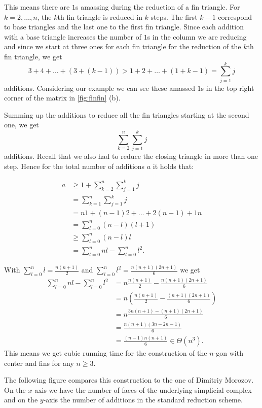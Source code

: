 This means there are $1$s amassing during the reduction of a fin triangle. For $k = 2,\dots,n$, the $k$th fin triangle is reduced in $k$ steps. The first $k-1$ correspond to base triangles and the last one to the first fin triangle. Since each addition with a base triangle increases the number of $1$s in the column we are reducing and since we start at three ones for each fin triangle for the reduction of the $k$th fin triangle, we get 
\[
	3 + 4 + \dots + (3 + (k-1)) > 1 + 2 + \dots + (1+k-1) = \sum_{j=1}^k j
\]
additions. Considering our example we can see these amassed $1$s in the top right corner of the matrix in \ref{fig:finfin} (b).

Summing up the additions to reduce all the fin triangles starting at the second one, we get 
\[
\sum_{k=2}^n \sum_{j=1}^k j
\]
additions. Recall that we also had to reduce the closing triangle in more than one step. Hence for the total number of additions $a$ it holds that: 

\begin{equation}
\begin{split}
 a & \geq 1+\sum_{k=2}^n \sum_{j=1}^k j \\
& = \sum_{k=1}^n \sum_{j=1}^k j\\
& = n1 + (n-1)2 + ... + 2(n-1) + 1n\\
& = \sum_{l=0}^n (n-l)(l+1) \\
& \geq \sum_{l=0}^n (n-l)l \\
& = \sum_{l=0}^n nl - \sum_{l=0}^n l^2.
\end{split}
\end{equation}

With $\sum_{l=0}^n l = \frac{n(n+1)}{2}$ and $\sum_{l=0}^n l^2 = \frac{n(n+1)(2n+1)}{6}$ we get
\begin{equation}
\begin{split}
 \sum_{l=0}^n nl - \sum_{l=0}^n l^2  & = n\frac{n(n+1)}{2} -\frac{n(n+1)(2n+1)}{6} \\
& = n(\frac{n(n+1)}{2} -\frac{(n+1)(2n+1)}{6}) \\
& = n\frac{3n(n+1)-(n+1)(2n+1)}{6} \\
& = \frac{n(n+1)(3n-2n-1)}{6} \\
&= \frac{(n-1)n(n+1)}{6} \in \Theta(n^3).
\end{split}
\end{equation}
This means we get cubic running time for the construction of the $n$-gon with center and fins for any $n\geq 3$. 

The following figure compares this construction to the one of Dimitriy Morozov. On the $x$-axis we have the number of faces of the underlying simplicial complex and on the $y$-axis the number of additions in the standard reduction scheme.

